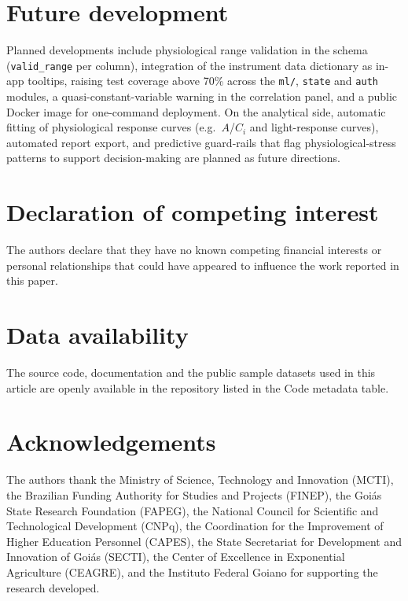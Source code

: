 \documentclass[a4paper,fleqn]{cas-dc}
\begin{document}
\section{Future development}\label{sec:future}

Planned developments include physiological range validation in the schema (\texttt{valid\_range} per column), integration of the instrument data dictionary as in-app tooltips, raising test coverage above 70\% across the \texttt{ml/}, \texttt{state} and \texttt{auth} modules, a quasi-constant-variable warning in the correlation panel, and a public Docker image for one-command deployment. On the analytical side, automatic fitting of physiological response curves (e.g.\ $A$/$C_i$ and light-response curves), automated report export, and predictive guard-rails that flag physiological-stress patterns to support decision-making are planned as future directions.

\section*{Declaration of competing interest}
The authors declare that they have no known competing financial interests or personal relationships that could have appeared to influence the work reported in this paper.

\section*{Data availability}
The source code, documentation and the public sample datasets used in this article are openly available in the repository listed in the Code metadata table.

\section*{Acknowledgements}

The authors thank the Ministry of Science, Technology and Innovation (MCTI), the Brazilian Funding Authority for Studies and Projects (FINEP), the Goi\'as State Research Foundation (FAPEG), the National Council for Scientific and Technological Development (CNPq), the Coordination for the Improvement of Higher Education Personnel (CAPES), the State Secretariat for Development and Innovation of Goi\'as (SECTI), the Center of Excellence in Exponential Agriculture (CEAGRE), and the Instituto Federal Goiano for supporting the research developed.



\end{document}
